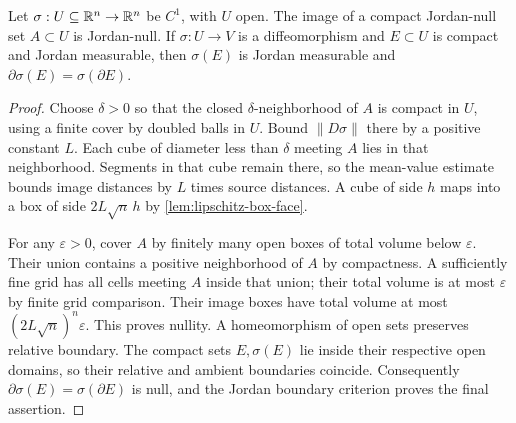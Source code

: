 \begin{lemma}
\label{lem:c1-jordan-null}
Let $\sigma:U\subseteq\mathbb{R}^n\to\mathbb{R}^n$ be $C^1$, with $U$ open.
The image of a compact Jordan-null set $A\subset U$ is Jordan-null.
If $\sigma:U\to V$ is a diffeomorphism and $E\subset U$ is compact
and Jordan measurable, then $\sigma(E)$ is Jordan measurable and
$\partial\sigma(E)=\sigma(\partial E)$.
\end{lemma}
\begin{proof}
Choose $\delta>0$ so that the closed $\delta$-neighborhood of $A$
is compact in $U$, using a finite cover by doubled balls in $U$.
Bound $\|D\sigma\|$ there by a positive constant $L$. Each cube of
diameter less than $\delta$ meeting $A$ lies in that neighborhood.
Segments in that cube remain there, so the mean-value estimate bounds
image distances by $L$ times source distances. A cube of side $h$ maps
into a box of side $2L\sqrt n\,h$ by \cref{lem:lipschitz-box-face}.

For any $\varepsilon>0$, cover $A$ by finitely many open boxes of
total volume below $\varepsilon$. Their union contains a positive
neighborhood of $A$ by compactness. A sufficiently fine grid has all
cells meeting $A$ inside that union; their total volume is at most
$\varepsilon$ by finite grid comparison. Their image boxes have total
volume at most $(2L\sqrt n)^n\varepsilon$. This proves nullity.
A homeomorphism of open sets preserves relative boundary. The compact
sets $E,\sigma(E)$ lie inside their respective open domains, so their
relative and ambient boundaries coincide. Consequently
$\partial\sigma(E)=\sigma(\partial E)$ is null, and the Jordan boundary
criterion proves the final assertion.
\end{proof}

